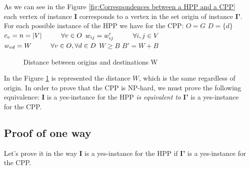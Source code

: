 \documentclass[12pt, a4paper, twoside]{memoir}
\newcommand{\newpar}{\vskip 0.2in \noindent}
\newcommand\tab[1][1cm]{\hspace*{#1}}
\begin{document}
{	\noindent As we can see in the Figure \ref{fig:Correspondences between a HPP and a CPP} each vertex of instance \textbf{I} corresponds to a vertex in the set origin of instance \textbf{I'}. \newline
	For each possible instance of the HPP we have for the CPP: \newline
	\tab $O=G$\newline
	\tab $D=\{d\}$\newline
	\tab $c_v=n=|V| \tab \forall v\in O$ \newline
	\tab $w_{ij}=w'_{ij} \tab \forall i, j\in V$\newline
	\tab $w_{vd}= W \tab \forall v\in O, \forall d\in D$\newline
	\tab $W\ge B$ \newline
	\tab $B'=W+B$
	
	\begin{figure}[H]
		\centering
		\caption{Distance between origins and destinations W}
		\label{fig:Distance between origins and destinations W}
	\end{figure}
	
	\noindent In the Figure \ref{fig:Distance between origins and destinations W} is represented the distance $W$, which is the same regardless of origin.
	\newpar
	In order to prove that the CPP is NP-hard, we must prove the following equivalence: \newline
	\textbf{I} is a yes-instance for the HPP \textit{is equivalent to} \textbf{I'} is a yes-instance for the CPP.
	
	\subsection{Proof of one way}
	\label{subsec:Proof of one way}
	
	Let's prove it in the way \textbf{I} is a yes-instance for the HPP if \textbf{I'} is a yes-instance for the CPP.
	
}
\end{document}
